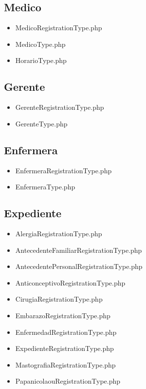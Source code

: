 		\subsection{Medico}
		\begin{itemize}
		\item MedicoRegistrationType.php
		\item MedicoType.php
		\item HorarioType.php
		\end{itemize}
		
		\subsection{Gerente}
		\begin{itemize}
		\item GerenteRegistrationType.php
		\item GerenteType.php
		\end{itemize}
		
		\subsection{Enfermera}
		\begin{itemize}
		\item EnfermeraRegistrationType.php
		\item EnfermeraType.php
		\end{itemize}
		
		\subsection{Expediente}
		\begin{itemize}
			\item AlergiaRegistrationType.php
			\item AntecedenteFamiliarRegistrationType.php
			\item AntecedentePersonalRegistrationType.php
			\item AnticonceptivoRegistrationType.php
			\item CirugiaRegistrationType.php
			\item EmbarazoRegistrationType.php
			\item EnfermedadRegistrationType.php
			\item ExpedienteRegistrationType.php
			\item MastografiaRegistrationType.php
			\item PapanicolaouRegistrationType.php
		\end{itemize}
